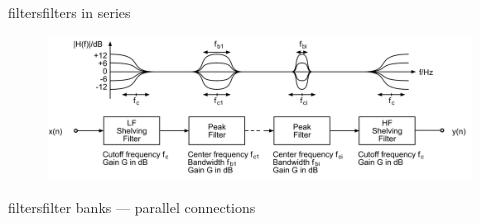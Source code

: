 	\begin{frame}{filters}{filters in series}
			\begin{figure}
				\centerline{\includegraphics[width=\linewidth]{graph/zolzer_filterchain}}
			\end{figure}
	\end{frame}
    \begin{frame}{filters}{filter banks --- parallel connections}
        \vspace{-3mm}
        \vspace{-2mm}
    \end{frame}
    
